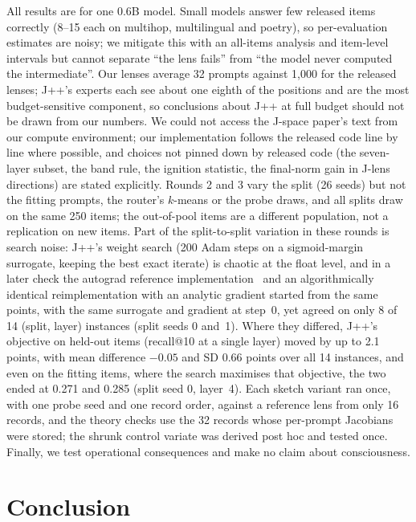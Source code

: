 \documentclass[11pt]{article}
\theoremstyle{definition}
\begin{document}
All results are for one 0.6B model. Small models answer few released items correctly (8--15 each on
multihop, multilingual and poetry), so per-evaluation estimates are noisy; we mitigate this with an
all-items analysis and item-level intervals but cannot separate ``the lens fails'' from ``the model
never computed the intermediate''. Our lenses average 32 prompts against 1,000 for the released
lenses; J++'s experts each see about one eighth of the positions and are the most budget-sensitive
component, so conclusions about J++ at full budget should not be drawn from our numbers. We could not
access the J-space paper's text from our compute environment; our implementation follows the released
code line by line where possible, and choices not pinned down by released code (the seven-layer subset,
the band rule, the ignition statistic, the final-norm gain in J-lens directions) are stated explicitly.
Rounds 2 and 3 vary the split (26 seeds) but not the fitting prompts, the router's $k$-means or the
probe draws, and all splits draw on the same 250 items; the out-of-pool items are a different
population, not a replication on new items.
Part of the split-to-split variation in these rounds is search noise: J++'s weight search (200 Adam
steps on a sigmoid-margin surrogate, keeping the best exact iterate) is chaotic at the float level,
and in a later check the autograd reference implementation~\citep{ayonrinde2026jpp} and an
algorithmically identical reimplementation with an analytic gradient started from the same points,
with the same surrogate and gradient at step~0, yet agreed on only 8 of 14 (split, layer) instances
(split seeds 0 and~1). Where they differed, J++'s objective on held-out items (recall@10 at a single
layer) moved by up to 2.1 points, with mean difference $-0.05$ and SD 0.66 points over all 14
instances, and even on the fitting items, where the search maximises that objective, the two ended
at 0.271 and 0.285 (split seed 0, layer~4). Each sketch variant ran once, with one probe seed and
one record order, against a reference lens from only 16 records, and the theory checks use the 32
records whose per-prompt Jacobians were stored; the shrunk control variate was derived post hoc and
tested once. Finally, we test operational consequences and make no claim about consciousness.

\section{Conclusion}
\end{document}
